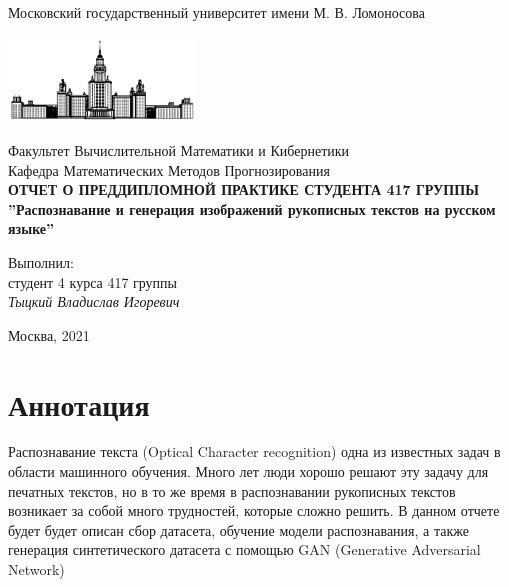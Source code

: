 \documentclass[12pt]{article}
\begin{document}
\begin{titlepage}
    \begin{center}
        Московский государственный университет имени М. В. Ломоносова
    
        \bigskip
        \includegraphics[width=50mm]{msu.pdf}
    
        \bigskip
        Факультет Вычислительной Математики и Кибернетики\\
        Кафедра Математических Методов Прогнозирования\\[10mm]
    
        {\large\bfseries
            ОТЧЕТ О ПРЕДДИПЛОМНОЙ ПРАКТИКЕ СТУДЕНТА 417 ГРУППЫ\\[10mm]
            ''Распознавание и генерация изображений рукописных текстов на русском языке''}
        \\[100mm]
        
    
        \begin{flushright}
            \parbox{0.4\textwidth}{
                Выполнил:\\
                студент 4 курса 417 группы\\
                \emph{Тыцкий Владислав Игоревич}
            }
        \end{flushright}
    
        \vspace{\fill}
        Москва, 2021
    \end{center}
\end{titlepage}


\section*{Аннотация}
Распознавание текста (Optical Character recognition) одна из известных задач в области машинного обучения.
Много лет люди хорошо решают эту задачу для печатных текстов, но в то же время в распознавании рукописных текстов
возникает за собой много трудностей, которые сложно решить. В данном отчете будет будет описан сбор датасета,
обучение модели распознавания, а также генерация синтетического датасета с помощью GAN (Generative Adversarial Network)

\newpage
\end{document}

